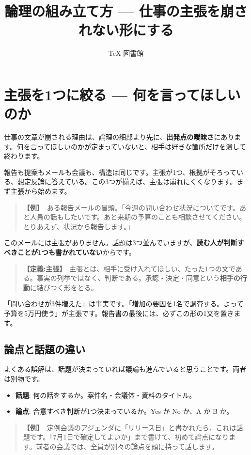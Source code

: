 \documentclass{article}
\title{論理の組み立て方 — 仕事の主張を崩されない形にする}
\author{TeX 図書館}
\begin{document}
\section{主張を1つに絞る — 何を言ってほしいのか}

仕事の文章が崩される理由は、論理の細部より先に、\textbf{出発点の曖昧さ}にあります。何を言ってほしいのかが定まっていないと、相手は好きな箇所だけを潰して終わります。

報告も提案もメールも会議も、構造は同じです。主張が1つ、根拠がそろっている、想定反論に答えている。この3つが揃えば、主張は崩れにくくなります。まず主張から始めます。

\begin{quote}
\textbf{【例】}\ ある報告メールの冒頭。「今週の問い合わせ状況についてです。あと人員の話もしたいです。あと来期の予算のことも相談させてください。とりあえず、状況から報告します。」
\end{quote}

このメールには主張がありません。話題は3つ並んでいますが、\textbf{読む人が判断すべきことが1つも書かれていない}からです。

\begin{quote}
\textbf{【定義:主張】}\ 主張とは、相手に受け入れてほしい、たった1つの文である。事実の列挙ではなく、判断である。承認・決定・同意という\textbf{相手の行動}に結びつく形をとる。
\end{quote}

「問い合わせが3件増えた」は事実です。「増加の要因を1名で調査する。よって予算を5万円使う」が主張です。報告書の最後には、必ずこの形の1文を置きます。

\subsection{論点と話題の違い}

よくある誤解は、話題が決まっていれば議論も進んでいると思うことです。両者は別物です。

\begin{itemize}
\item \textbf{話題}: 何の話をするか。案件名・会議体・資料のタイトル。
\item \textbf{論点}: 合意すべき判断が1つ決まっているか。Yes か No か、A か B か。
\end{itemize}

\begin{quote}
\textbf{【例】}\ 定例会議のアジェンダに「リリース日」と書かれたら、これは話題です。「7月1日で確定してよいか」まで書けて、初めて論点になります。前者の会議では、全員が別々の論点を頭に持って話します。
\end{quote}
\end{document}
